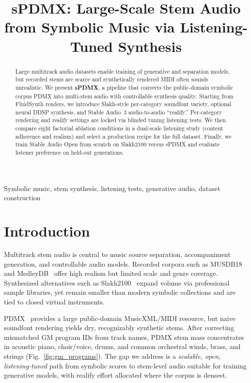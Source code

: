 \documentclass{article}
\title{sPDMX: Large-Scale Stem Audio from Symbolic Music via Listening-Tuned Synthesis}
\begin{document}
%
\maketitle
%
\begin{abstract}
Large multitrack audio datasets enable training of generative and separation models, but recorded stems are scarce and synthetically rendered MIDI often sounds unrealistic.
We present \textbf{sPDMX}, a pipeline that converts the public-domain symbolic corpus PDMX into multi-stem audio with controllable synthesis quality.
Starting from FluidSynth renders, we introduce Slakh-style per-category soundfont variety, optional neural DDSP synthesis, and Stable Audio~3 audio-to-audio ``realify.''
Per-category rendering and realify settings are locked via blinded tuning listening tests.
We then compare eight factorial ablation conditions in a dual-scale listening study (content adherence and realism) and select a production recipe for the full dataset.
Finally, we train Stable Audio Open from scratch on Slakh2100 versus sPDMX and evaluate listener preference on held-out generations.
\end{abstract}
%
\begin{keywords}
Symbolic music, stem synthesis, listening tests, generative audio, dataset construction
\end{keywords}
%
\section{Introduction}
\label{sec:intro}

Multitrack stem audio is central to music source separation, accompaniment generation, and controllable audio models.
Recorded corpora such as MUSDB18~\cite{rafii2019musdb18} and MedleyDB~\cite{bittner2014medleydb} offer high realism but limited scale and genre coverage.
Synthesized alternatives such as Slakh2100~\cite{manilow2019cutting} expand volume via professional sample libraries, yet remain smaller than modern symbolic collections and are tied to closed virtual instruments.

PDMX~\cite{long2024pdmx,xu2024generating} provides a large public-domain MusicXML/MIDI resource, but naive soundfont rendering yields dry, recognizably synthetic stems.
After correcting mismatched GM program IDs from track names, PDMX stem mass concentrates in acoustic piano, choir/voice, drums, and common orchestral winds, brass, and strings (Fig.~\ref{fig:gm_programs}).
The gap we address is a \emph{scalable, open, listening-tuned} path from symbolic scores to stem-level audio suitable for training generative models, with realify effort allocated where the corpus is densest.
\end{document}
